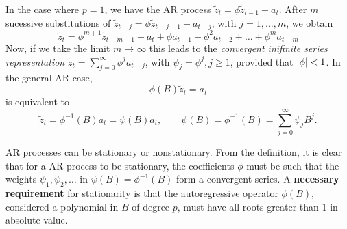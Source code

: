   In the case where \(p=1\), we have the AR process \(\tilde z_{t} = \phi \tilde z_{t-1} + a_{t}\). After \(m\) sucessive substitutions of \(\tilde z_{t-j} = \phi \tilde z_{t-j-1} + a_{t-j} \), with \(j = 1,\dots,m\), we obtain
  \[
    \tilde z_{t} = \phi^{m+1}\tilde z_{t-m-1}+ a_{t} + \phi a_{t-1} + \phi^{2}a_{t-2} + \dots + \phi^{m}a_{t-m}
  \]
  Now, if we take the limit \(m\to \infty\) this leads to the \emph{convergent inifinite series representation} \(\tilde z_{t} = \sum_{j=0}^{\infty}\phi^{j}a_{t-j}\), with \(\psi_{j} = \phi^{j}, j \geq 1\), provided that \(\left\lvert \phi \right\rvert < 1\). In the general AR case,
  \[
    \phi(B) \tilde z_{t} = a_{t}
  \]
  is equivalent to
  \[
    \tilde z_{t} = \phi^{-1}(B) a_{t} = \psi(B)a_{t}, \quad \quad \psi(B) = \phi^{-1}(B) = \sum_{j=0}^{\infty}\psi_{j}B^{j}.
  \]

  AR processes can be stationary or nonstationary. From the definition, it is clear that for a AR process to be stationary, the coefficients \(\phi\) must be such that the weights \(\psi_{1},\psi_{2},\dots\) in \(\psi(B) = \phi^{-1}(B)\) form a convergent series. A \textbf{necessary requirement} for stationarity is that the autoregressive operator \(\phi(B)\), considered a polynomial in \(B\) of degree \(p\), must have all roots greater than \(1\) in absolute value.
